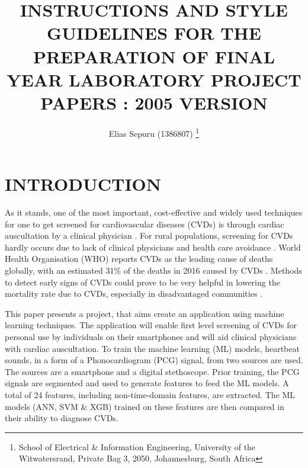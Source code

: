 \documentclass[10pt,twocolumn]{witseiepaper}
\begin{document}
\title{INSTRUCTIONS AND STYLE GUIDELINES FOR THE PREPARATION OF FINAL YEAR LABORATORY PROJECT PAPERS : 2005 VERSION}

\author{Elias Sepuru (1386807)
\thanks{School of Electrical \& Information Engineering, University of the
Witwatersrand, Private Bag 3, 2050, Johannesburg, South Africa}
}


%



\maketitle
\thispagestyle{empty}\pagestyle{empty}


%
\section{INTRODUCTION}
\label{intro}
As it stands, one of the most important, cost-effective and widely used techniques for one to get screened for cardiovascular diseases (CVDs) is through cardiac auscultation by a clinical physician \cite{28_gavrovska2017identification, 32_montinari2019first}. For rural populations, screening for CVDs hardly occurs due to lack of clinical physicians and health care avoidance \cite{33,34}. World Health Organisation (WHO) reports CVDs as the leading cause of deaths globally, with an estimated 31\% of the deaths in 2016 caused by CVDs \cite{WHO}. Methods to detect early signs of CVDs could prove to be very helpful in lowering the mortality rate due to CVDs, especially in disadvantaged communities \cite{34}.

This paper presents a project, that aims create an application using machine learning techniques. The application will enable first level screening of CVDs for personal use by individuals on their smartphones and will aid clinical physicians with cardiac auscultation. To train the machine learning (ML) models, heartbeat sounds, in a form of a Phonocardiogram (PCG) signal, from two sources are used. The sources are a smartphone and a digital stethoscope. Prior training, the PCG signals are segmented and used to generate features to feed the ML models. A total of 24 features, including non-time-domain features, are extracted. The ML models (ANN, SVM \& XGB) trained on these features are then compared in their ability to diagnose CVDs.
\end{document}
